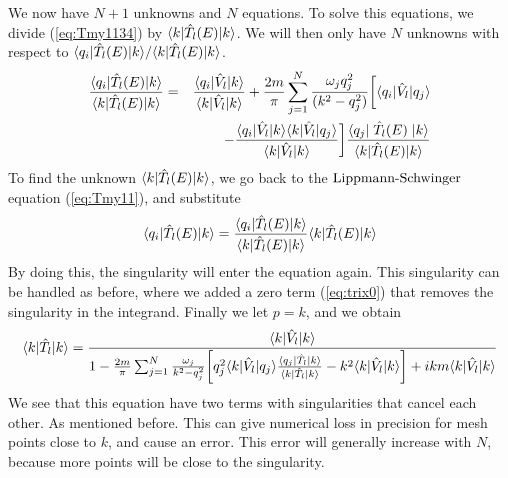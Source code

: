 We now have $N+1$ unknowns and $N$ equations. 
To solve this equations, we divide (\ref{eq:Tmy1134}) by $\langle k|\hat{T}_l(E)| k\rangle$.
We will then only have $N$ unknowns with respect to $\langle{ q_i}|\hat{T}_l(E)|{ k}\rangle/\langle k|\hat{T}_l(E)| k\rangle$.
\begin{eqnarray}\label{eq:Tmy11345}
\frac{\braketm{{ q_i}} {\op{T}_l(E)}{{ k}}}{\braketm{ k}{\op{T}_l(E)}{ k}} &=&
\frac{\braketm{ q_i}{\op{V}_l}{k} }{\braketm{ k}{\op{V}_l}{ k }}
+ \frac{2m}{\pi}\sum^N_{j=1}\frac{\omega_j q^2_j}{(k^2- q^2_j)} \bigg[\bra{{ q_i}}\op{V}_l\ket{{{ q}_j}}\nonumber\\
&&
-\frac{\bra{{ q_i}}\op{V}_l\ket{{ k}}\braketm{{k}}{\op{V}_l}{{ q_j}} }{\braketm{{ k}}{\op{V}_l}{{k}} }\bigg]
\frac{\bra{{ q_j}} \;
\op{T}_l(E)\;\ket{{ k}}}{\braketm{ k}{\op{T}_l(E)}{ k}}%
\end{eqnarray}
To find the unknown ${\langle k|\hat{T}_l(E)| k\rangle}$, we go back to the $\text{Lippmann-Schwinger}$ equation  
(\ref{eq:Tmy11}), and substitute
\begin{equation}
{\ensuremath{\langle{ q_i}|\hat{T}_l(E)|{ k}\rangle}}
=
\frac{\langle{ q_i}|\hat{T}_l(E)|{ k}\rangle}{\langle k|\hat{T}_l(E)| k\rangle}{\langle k|\hat{T}_l(E)| k\rangle} 
\end{equation}
By doing this, the singularity will enter the equation again. This singularity can be handled 
as before, where we added a zero term (\ref{eq:trix0}) that removes the singularity in the integrand.
Finally we let $p=k$, and we obtain
\begin{equation}\label{eq:Tmy113456} 
{\braketm{ k}{\op{T}_l}{ k}}
=
\frac{\braketm{{k}}{\op{V}_l}{{ k}} }
{1-\frac{2m}{\pi}\sum_{j=1}^N \frac{\omega_j}{ k^2- q^2_j}
\bigg[q^2_j\braketm{{ k}}{\op{V}_l}{{ q_j}}
\frac{\braketm{{ q_j}} {\op{T}_l}{{ k}}}{\braketm{ k}{\op{T}_l}{ k}}
-{ k^2\braketm{{ k}}{\op{V}_l}{{ k}}} \bigg]
+
i { k}m \bra{{ k}}\op{V_l}\ket{{ k}}    }
\end{equation}
We see that this equation have two terms with singularities  that cancel each other.
As mentioned before. This can give numerical loss in precision for mesh points close to $k$, and cause an error. This error
will generally increase with $N$, because more points will be close to the singularity. 
